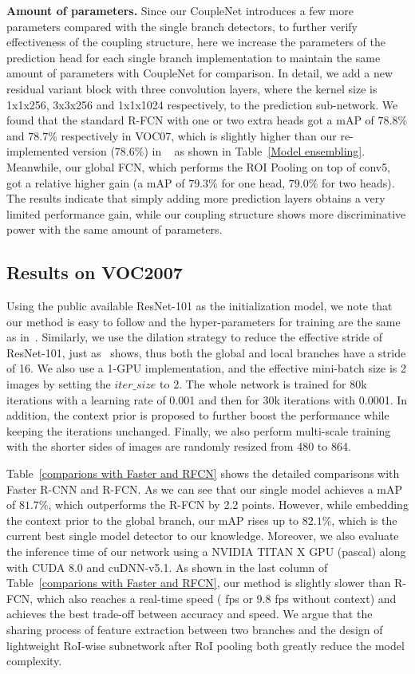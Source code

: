 \documentclass[10pt,twocolumn,letterpaper]{article}
\begin{document}
\textbf{Amount of parameters.} Since our CoupleNet introduces a few more parameters compared with the single branch detectors, to further verify effectiveness of the coupling structure, here we increase the parameters of the prediction head for each single branch implementation to maintain the same amount of parameters with CoupleNet for comparison. In detail, we add a new residual variant block with three convolution layers, where the kernel size is 1x1x256, 3x3x256 and 1x1x1024 respectively, to the prediction sub-network. We found that the standard R-FCN with one or two extra heads got a mAP of $78.8\%$ and $78.7\%$ respectively in VOC07, which is slightly higher than our re-implemented version ($78.6\%$) in ~\cite{li2016r} as shown in Table~\ref{Model ensembling}. Meanwhile, our global FCN, which performs the ROI Pooling on top of conv5, got a relative higher gain (a mAP of $79.3\%$ for one head, $79.0\%$ for two heads). The results indicate that simply adding more prediction layers obtains a very limited performance gain, while our coupling structure shows more discriminative power with the same amount of parameters.

\subsection{Results on VOC2007}
Using the public available ResNet-101 as the initialization model, we note that our method is easy to follow and the hyper-parameters for training are the same as in~\cite{li2016r}. Similarly, we use the dilation strategy to reduce the effective stride of ResNet-101, just as~\cite{li2016r} shows, thus both the global and local branches have a stride of 16. We also use a 1-GPU implementation, and the effective mini-batch size is 2 images by setting the $iter\_size$ to 2. The whole network is trained for 80k iterations with a learning rate of 0.001 and then for 30k iterations with 0.0001. In addition, the context prior is proposed to further boost the performance while keeping the iterations unchanged. Finally, we also perform multi-scale training with the shorter sides of images are randomly resized from 480 to 864.

Table~\ref{comparions with Faster and RFCN} shows the detailed comparisons with Faster R-CNN and R-FCN. As we can see that our single model achieves a mAP of $81.7\%$, which outperforms the R-FCN by 2.2 points. However, while embedding the context prior to the global branch, our mAP rises up to $82.1\%$, which is the current best single model detector to our knowledge. Moreover, we also evaluate the inference time of our network using a NVIDIA TITAN X GPU (pascal) along with CUDA 8.0 and cuDNN-v5.1. As shown in the last column of Table~\ref{comparions with Faster and RFCN}, our method is slightly slower than R-FCN, which also reaches a real-time speed ( fps or 9.8 fps without context) and achieves the best trade-off between accuracy and speed. We argue that the sharing process of feature extraction between two branches and the design of lightweight RoI-wise subnetwork after RoI pooling both greatly reduce the model complexity.
\end{document}
